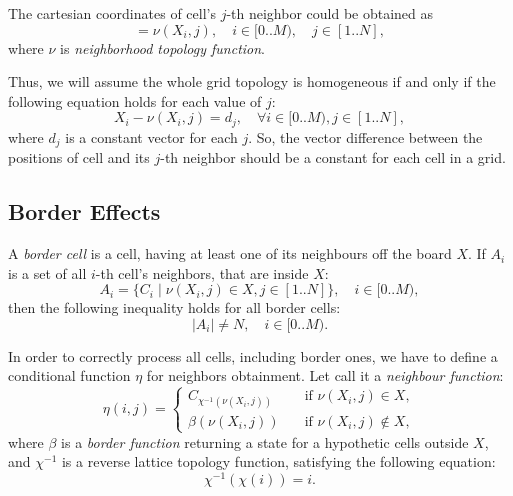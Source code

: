 \documentclass[a4paper,12pt,tikz,UTF8]{article}
\begin{document}
    The cartesian coordinates of cell's $j$-th neighbor could be obtained as
    \begin{equation}
      [ x_0, ..., x_{D - 1} ] = \nu(X_i, j), \quad i \in {[0 .. M)}, \quad j \in {[1 .. N]},
    \end{equation}
    where $\nu$ is \textit{neighborhood topology function}. 

    Thus, we will assume the whole grid topology is homogeneous if and only if the following equation holds for each value of $j$:
    \begin{equation}
      X_i - \nu(X_i, j) = d_j, \quad \forall i \in {[0 .. M)}, j \in [1 .. N],
    \end{equation}
    where $d_j$ is a constant vector for each $j$. So, the vector difference between the positions of cell and its $j$-th neighbor should be a constant for each cell in a grid.

  \subsection {Border Effects}

    A \textit{border cell} is a cell, having at least one of its neighbours off the board $X$. If $A_i$ is a set of all $i$-th cell's neighbors, that are inside $X$:
    \begin{equation}
      A_i = \{ C_i \mid \nu(X_i, j) \in X, j \in [1 .. N] \}, \quad i \in {[0 .. M)},
    \end{equation}
    then the following inequality holds for all border cells:
    \begin{equation}
      | A_i | \neq N, \quad i \in [0 .. M).
    \end{equation}

    In order to correctly process all cells, including border ones, we have to define a conditional function $\eta$ for neighbors obtainment. Let call it a \textit{neighbour function}:
    \begin{equation}
      \eta(i, j) = 
      \begin{cases}
        C_{\chi^{-1}(\nu(X_i, j))} & \quad \text{if } \nu(X_i, j) \in X,\\  
        \beta(\nu(X_i, j)) & \quad \text{if } \nu(X_i, j) \notin X,
      \end{cases}
    \end{equation}
    where $\beta$ is a \textit{border function} returning a state for a hypothetic cells outside $X$, and $\chi^{-1}$ is a reverse lattice topology function, satisfying the following equation:
    \begin{equation}
      \chi^{-1}(\chi(i)) = i.
    \end{equation}
\end{document}
